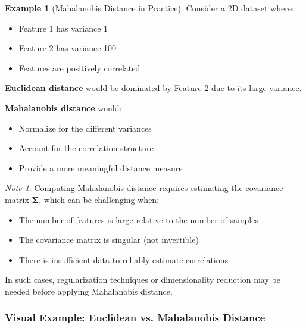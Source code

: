 \documentclass[11pt,a4paper]{article}
\theoremstyle{definition}
\newtheorem{example}{Example}[section]
\theoremstyle{plain}
\theoremstyle{remark}
\newtheorem*{remark}{Note}
\begin{document}
\begin{example}[Mahalanobis Distance in Practice]
Consider a 2D dataset where:
\begin{itemize}
    \item Feature 1 has variance 1
    \item Feature 2 has variance 100
    \item Features are positively correlated
\end{itemize}

\textbf{Euclidean distance} would be dominated by Feature 2 due to its large variance.

\textbf{Mahalanobis distance} would:
\begin{itemize}
    \item Normalize for the different variances
    \item Account for the correlation structure
    \item Provide a more meaningful distance measure
\end{itemize}
\end{example}

\begin{remark}
Computing Mahalanobis distance requires estimating the covariance matrix $\boldsymbol{\Sigma}$, which can be challenging when:
\begin{itemize}
    \item The number of features is large relative to the number of samples
    \item The covariance matrix is singular (not invertible)
    \item There is insufficient data to reliably estimate correlations
\end{itemize}
In such cases, regularization techniques or dimensionality reduction may be needed before applying Mahalanobis distance.
\end{remark}

\subsubsection{Visual Example: Euclidean vs. Mahalanobis Distance}
\end{document}
